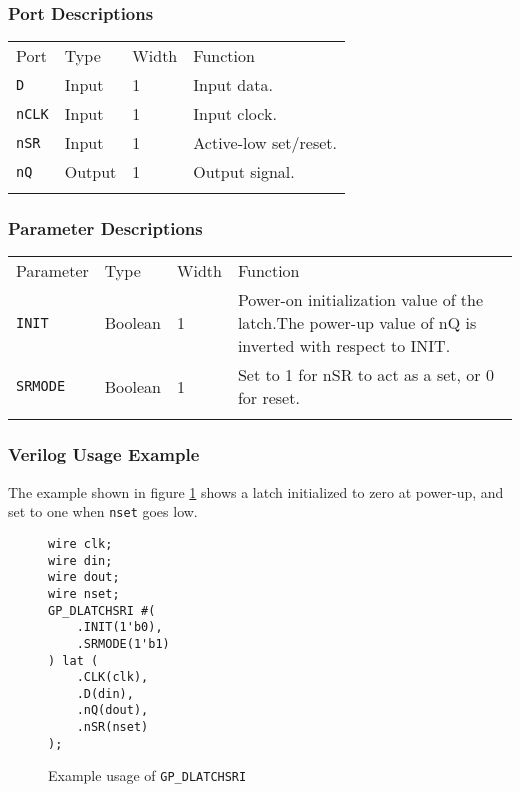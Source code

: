 \documentclass[11pt]{article}
\newcommand{\tokenstyle}[1]{\texttt{#1}}
\newcommand{\wirestyle}[1]{\texttt{#1}}
\newcommand{\whenstyle}[1]{{\fontseries{sb}\selectfont#1}}
\newcommand{\thinhline}{\Xhline{1\arrayrulewidth}}
\newcommand{\thickhline}{\Xhline{2.5\arrayrulewidth}}
\begin{document}
\subsubsection{Port Descriptions}

\begin{tabularx}{\textwidth}{lllX}
\thinhline
\whenstyle{Port} & \whenstyle{Type} & \whenstyle{Width} & \whenstyle{Function} \\
\thickhline
\tokenstyle{D} & Input & 1 & Input data. \\
\thinhline
\tokenstyle{nCLK} & Input & 1 & Input clock. \\
\thinhline
\tokenstyle{nSR} & Input & 1 & Active-low set/reset. \\
\thinhline
\tokenstyle{nQ} & Output & 1 & Output signal. \\
\thinhline
\end{tabularx}

\subsubsection{Parameter Descriptions}

\begin{tabularx}{\textwidth}{lllX}
\thinhline
\whenstyle{Parameter} & \whenstyle{Type} & \whenstyle{Width} & \whenstyle{Function} \\
\thickhline
\tokenstyle{INIT} & Boolean & 1 & Power-on initialization value of the latch.\newline The power-up value of nQ is
inverted with respect to INIT.\\
\thinhline
\tokenstyle{SRMODE} & Boolean & 1 & Set to 1 for nSR to act as a set, or 0 for reset. \\
\thinhline
\end{tabularx}

\subsubsection{Verilog Usage Example}

The example shown in figure \ref{gp-dlatchsri-example} shows a latch initialized to zero at power-up, and set to one
when \wirestyle{nset} goes low.

\begin{figure}[h]
\begin{lstlisting}
wire clk;
wire din;
wire dout;
wire nset;
GP_DLATCHSRI #(
	.INIT(1'b0),
	.SRMODE(1'b1)
) lat (
	.CLK(clk),
	.D(din),
	.nQ(dout),
	.nSR(nset)
);
\end{lstlisting}
\caption{Example usage of \tokenstyle{GP\_DLATCHSRI}}
\label{gp-dlatchsri-example}
\end{figure}
\end{document}
